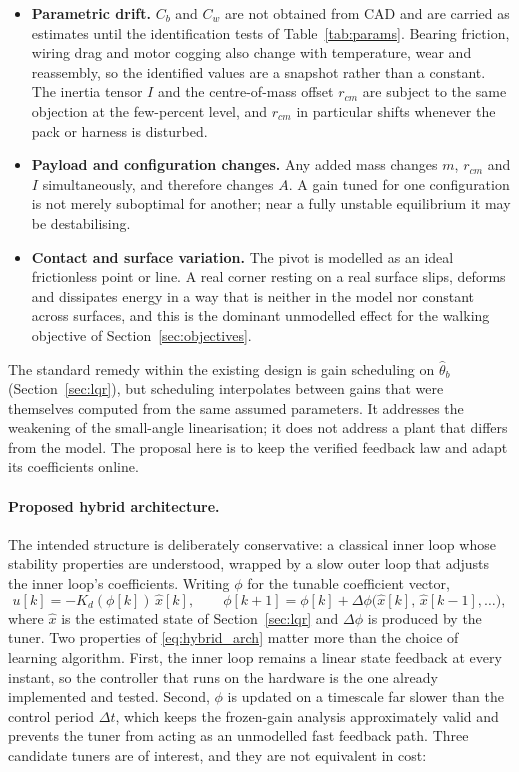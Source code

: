 \begin{itemize}
    \item \textbf{Parametric drift.} $C_b$ and $C_w$ are not obtained from
    CAD and are carried as estimates until the identification tests of
    Table~\ref{tab:params}.
    Bearing friction,
    wiring drag and motor cogging also change with temperature, wear and
    reassembly, so the identified values are a snapshot rather than a
    constant. The inertia tensor $I$ and the centre-of-mass offset $r_{cm}$
    are subject to the same objection at the few-percent level, and $r_{cm}$
    in particular shifts whenever the pack or harness is disturbed.
    \item \textbf{Payload and configuration changes.} Any added mass changes
    $m$, $r_{cm}$ and $I$ simultaneously, and therefore changes $A$. A gain
    tuned for one configuration is not merely suboptimal for another; near a
    fully unstable equilibrium it may be destabilising.
    \item \textbf{Contact and surface variation.} The pivot is modelled as an
    ideal frictionless point or line. A real corner resting on a real surface
    slips, deforms and dissipates energy in a way that is neither in the model
    nor constant across surfaces, and this is the dominant unmodelled effect
    for the walking objective of Section~\ref{sec:objectives}.
\end{itemize}

The standard remedy within the existing design is gain scheduling on
$\hat\theta_b$ (Section~\ref{sec:lqr}), but scheduling interpolates
between gains that were themselves computed from the same assumed parameters.
It addresses the weakening of the small-angle linearisation; it does not
address a plant that differs from the model. The proposal here is to keep the
verified feedback law and adapt its coefficients online.

\paragraph{Proposed hybrid architecture.} The intended structure is deliberately conservative: a classical inner loop
whose stability properties are understood, wrapped by a slow outer loop that
adjusts the inner loop's coefficients. Writing $\phi$ for the tunable
coefficient vector,
\begin{equation}
u[k] = -K_d(\phi[k])\,\hat x[k],
\qquad
\phi[k+1] = \phi[k] + \Delta\phi\big(\hat x[k],\, \hat x[k-1], \dots\big),
\label{eq:hybrid_arch}
\end{equation}
where $\hat x$ is the estimated state of Section~\ref{sec:lqr} and
$\Delta\phi$ is produced by the tuner. Two properties of
\eqref{eq:hybrid_arch} matter more than the choice of learning algorithm.
First, the inner loop remains a linear state feedback at every instant, so
the controller that runs on the hardware is the one already implemented and
tested. Second, $\phi$ is updated on a timescale far slower than the control
period $\Delta t$, which keeps the frozen-gain analysis approximately valid
and prevents the tuner from acting as an unmodelled fast feedback path. Three
candidate tuners are of interest, and they are not equivalent in cost:

